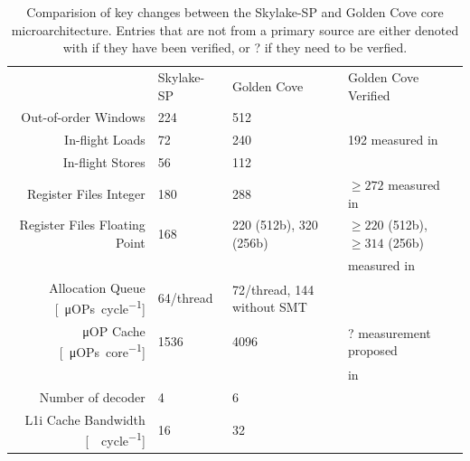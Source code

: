 \begin{table}
	\centering
	\caption{\label{tab:micro-arch-params}Comparision of key changes between the Skylake-SP and Golden Cove core microarchitecture. Entries that are not from a primary source are either denoted with \checkmark if they have been verified, or ? if they need to be verfied.}
	\begin{tabular}{r|lll}
		\toprule
			&	Skylake-SP & Golden Cove & Golden Cove Verified \\
		\rowcolor[HTML]{EFEFEF}Out-of-order Windows		& 224~\cite{Intel_2017_Skylake_SP} & 512~\cite{Intel_2021_Architecture_Day,ServerTheHome_2023_SPR_Press,Wccftech_2023_SPR_Press} & \checkmark~\figref{robsize-reorder} \\
		In-flight Loads & 72~\cite{Intel_2017_Skylake_SP} & 240~\cite{ServerTheHome_2023_SPR_Press,Wccftech_2023_SPR_Press} & 192 measured in~\figref{robsize-load} \\
		\rowcolor[HTML]{EFEFEF}In-flight Stores & 56~\cite{Intel_2017_Skylake_SP} & 112~\cite{ServerTheHome_2023_SPR_Press,Wccftech_2023_SPR_Press} & \checkmark~\figref{robsize-store} \\
		Register Files Integer & 180~\cite{Intel_2017_Skylake_SP} & 288~\cite{ServerTheHome_2023_SPR_Press,Wccftech_2023_SPR_Press} & $\geq 272$ measured in~\figref{robsize-registers} \\
		\rowcolor[HTML]{EFEFEF}Register Files Floating Point & 168~\cite{Intel_2017_Skylake_SP} & 220 (512b), 320 (256b)~\cite{ServerTheHome_2023_SPR_Press,Wccftech_2023_SPR_Press} & $\geq 220$ (512b), $\geq 314$ (256b) \\
		\rowcolor[HTML]{EFEFEF} & & & measured in~\figref{robsize-registers} \\
		Allocation Queue [\SI{}{\micro OPs\per cycle}]& 64/thread~\cite{Intel_2017_Skylake_SP} & 72/thread, 144 without SMT~\cite{Intel_2021_Architecture_Day,ServerTheHome_2023_SPR_Press,Wccftech_2023_SPR_Press,Intel_Optimization_Reference_Manual_050} & \\
		\rowcolor[HTML]{EFEFEF}μOP Cache [\SI{}{\micro OPs\per core}] & \SI{1536}{}~\cite{Wikichip_SkylakeSP} & \SI{4096}{}~\cite{Intel_2021_Architecture_Day} & ? measurement proposed \\
		\rowcolor[HTML]{EFEFEF} & & & in~\cite{Schoene_2021_FIRESTARTER2} \\
		Number of decoder & \SI{4}{}~\cite{Wikichip_SkylakeSP} & \SI{6}{}~\cite{Intel_2021_Architecture_Day,Intel_Optimization_Reference_Manual_050} & \\
		\rowcolor[HTML]{EFEFEF}L1i Cache Bandwidth [\SI{}{\byte\per cycle}] & \SI{16}{}~\cite{Wikichip_SkylakeSP} & \SI{32}{}~\cite{Intel_Optimization_Reference_Manual_050} & \\

\end{tabular}
\end{table}
